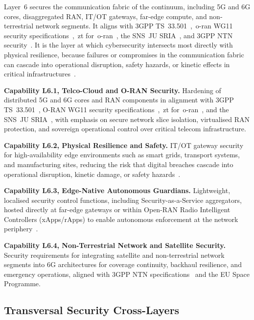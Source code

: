 \documentclass{ieeeaccess}
\begin{document}
Layer~6 secures the communication fabric of the continuum, including 5G and 6G cores, disaggregated RAN, IT/OT gateways, far-edge compute, and non-terrestrial network segments. It aligns with 3GPP TS~33.501~\cite{tgpp33501},~\gls{o-ran} WG11 security specifications~\cite{oran2024},~\gls{zt} for~\gls{o-ran}~\cite{oranzt2024}, the SNS~JU SRIA~\cite{snsju2023}, and 3GPP NTN security~\cite{tgppntn,tgpp33836}. It is the layer at which cybersecurity intersects most directly with physical resilience, because failures or compromises in the communication fabric can cascade into operational disruption, safety hazards, or kinetic effects in critical infrastructures~\cite{alwarafy2021,ranaweera2021}.

\textbf{Capability L6.1, Telco-Cloud and O-RAN Security.} Hardening of distributed 5G and 6G cores and RAN components in alignment with 3GPP TS~33.501~\cite{tgpp33501}, O-RAN WG11 security specifications~\cite{oran2024},~\gls{zt} for~\gls{o-ran}~\cite{oranzt2024}, and the SNS~JU SRIA~\cite{snsju2023}, with emphasis on secure network slice isolation, virtualised RAN protection, and sovereign operational control over critical telecom infrastructure.

\textbf{Capability L6.2, Physical Resilience and Safety.} IT/OT gateway security for high-availability edge environments such as smart grids, transport systems, and manufacturing sites, reducing the risk that digital breaches cascade into operational disruption, kinetic damage, or safety hazards~\cite{tgpp33501,snsju2023,alwarafy2021,ranaweera2021}.

\textbf{Capability L6.3, Edge-Native Autonomous Guardians.} Lightweight, localised security control functions, including Security-as-a-Service aggregators, hosted directly at far-edge gateways or within Open-RAN Radio Intelligent Controllers (xApps/rApps) to enable autonomous enforcement at the network periphery~\cite{oran2024,oranzt2024,snsju2023}.

\textbf{Capability L6.4, Non-Terrestrial Network and Satellite Security.} Security requirements for integrating satellite and non-terrestrial network segments into 6G architectures for coverage continuity, backhaul resilience, and emergency operations, aligned with 3GPP NTN specifications~\cite{tgppntn,tgpp33836} and the EU Space Programme.

\subsection{Transversal Security Cross-Layers}
\end{document}
